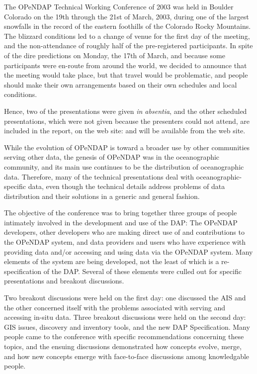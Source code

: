 The \ac{OPeNDAP} Technical Working Conference of 2003 was held in
Boulder Colorado on the 19th through the 21st of March, 2003, during
one of the largest snowfalls in the record of the eastern foothills of
the Colorado Rocky Mountains.  The blizzard conditions led to a change
of venue for the first day of the meeting, and the non-attendance of
roughly half of the pre-registered participants.  In spite of the dire
predictions on Monday, the 17th of March, and because some
participants were en-route from around the world, we decided to
announce that the meeting would take place, but that travel would be
problematic, and people should make their own arrangements based on
their own schedules and local conditions.

Hence, two of the presentations were given \emph{in absentia}, and the
other scheduled presentations, which were not given because the
presenters could not attend, are included in the report, on the web
site:
and will be available from the web site.

While the evolution of \ac{OPeNDAP} is toward a broader use by other
communities serving other data, the genesis of \ac{OPeNDAP} was in the
oceanographic community, and its main use continues to be the
distribution of oceanographic data.  Therefore, many of the technical
presentations deal with oceanographic-specific data, even though the
technical details address problems of data distribution and their
solutions in a generic and general fashion.

The objective of the conference was to bring together three groups
of people intimately involved in the development and use of the
\ac{DAP}:  The \ac{OPeNDAP} developers, other developers who are
making direct use of and contributions to the \ac{OPeNDAP} system,
and data providers and users who have experience with providing
data and/or accessing and using data via the \ac{OPeNDAP} system.
Many elements of the system are being developed, not the least of
which is a re-specification of the \ac{DAP}.  Several of these elements
were culled out for specific presentations and breakout discussions.

Two breakout discussions were held on the first day: one discussed the
\ac{AIS} and the other concerned itself with the problems associated
with serving and accessing in-situ data.  Three breakout discussions
were held on the second day: \ac{GIS} issues, discovery and inventory
tools, and the new \ac{DAP} Specification.  Many people came to the
conference with specific recommendations concerning these topics, and
the ensuing discussions demonstrated how concepts evolve, merge, and
how new concepts emerge with face-to-face discussions among
knowledgable people.

